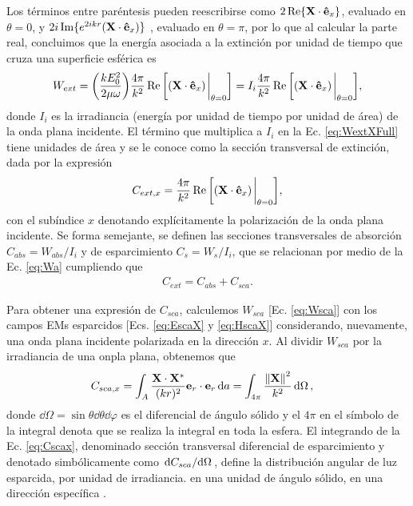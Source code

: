 %
Los términos entre paréntesis pueden reescribirse como $2\Re\{\vb{X}\cdot\vu{e}_x\}$, evaluado en $\theta = 0$, y $2i\Im\{e^{2ikr}(\vb{X}\cdot\vu{e}_x)\}$	, evaluado en $\theta = \pi$, por lo que al calcular la parte real, concluimos que la energía  asociada a la extinción  por unidad de tiempo que cruza una superficie esférica es
%
\begin{align}
W_{ext} = \qty(\frac{kE_0^2}{2\mu\omega})\frac{4\pi}{k^2} \Re\qty[(\vb{X}\cdot\vu{e}_x)\eval_{\theta = 0 }] = I_i \frac{4\pi}{k^2}\Re\qty[(\vb{X}\cdot\vu{e}_x)\eval_{\theta = 0 }],
\label{eq:WextXFull}
\end{align}
% 
donde $I_i$ es la irradiancia (energía por unidad de tiempo por unidad de área) de la onda plana incidente. El término que multiplica a $I_i$ en la Ec. \eqref{eq:WextXFull} tiene unidades de área y se le conoce como la sección transversal de extinción, dada por la expresión
%
\begin{align}
C_{ext,x} = \frac{4\pi}{k^2}\Re\qty[(\vb{X}\cdot\vu{e}_x)\eval_{\theta = 0 }],
\label{eq:Cextx}
\end{align}
%
con el subíndice $x$ denotando explícitamente la polarización de la onda plana incidente. Se forma semejante, se definen las secciones transversales de absorción $C_{abs} = W_{abs}/I_i$ y de esparcimiento $C_s = W_s/I_i$, que se relacionan por medio de la Ec.  \eqref{eq:Wa} cumpliendo que
%
\begin{align}
C_{ext} = C_{abs} + C_{sca}.
\label{eq:C-All}
\end{align}
%

Para obtener una expresión de $C_{sca}$, calculemos  $W_{sca}$ [Ec. \eqref{eq:Wsca}] con los campos EMs esparcidos [Ecs. \eqref{eq:EscaX} y \eqref{eq:HscaX}] considerando, nuevamente, una onda plana incidente polarizada en la dirección $x$. Al dividir $W_{sca}$ por la irradiancia de una onpla plana, obtenemos que
%
\begin{align}
C_{sca,x} &=  \int_A \frac{\vb{X}\cdot\vb{X}^*}{(kr)^2}\vb{e}_r\cdot\vb{e}_r\dd{a} = \int_{4\pi}\frac{\norm{\vb{X}}^2}{k^2}\dd{\Omega},
 \label{eq:Cscax}
\end{align}
%
donde $\dd{\Omega} = \sin\theta\dd{\theta}\dd{\varphi}$ es el diferencial de ángulo sólido y el $4\pi$ en el símbolo de la integral denota que se realiza la integral en toda la esfera. El integrando de la Ec. \eqref{eq:Cscax}, denominado sección transversal diferencial de esparcimiento y denotado simbólicamente como $\dv*{C_{sca}}{\Omega}$, define la distribución angular de luz esparcida, por unidad de irradiancia. en una unidad de ángulo sólido, en una dirección específica \cite{bohren1998absorption}.

